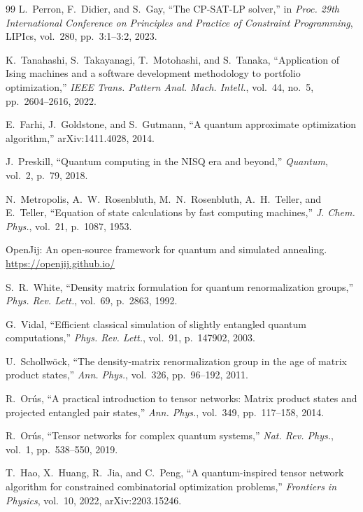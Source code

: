 \documentclass[twocolumn]{article}
\begin{document}
\begin{thebibliography}{99}
L.~Perron, F.~Didier, and S.~Gay,
``The CP-SAT-LP solver,''
in \emph{Proc. 29th International Conference on Principles and Practice
of Constraint Programming}, LIPIcs, vol.~280, pp.~3:1--3:2, 2023.

K.~Tanahashi, S.~Takayanagi, T.~Motohashi, and S.~Tanaka,
``Application of Ising machines and a software development methodology
to portfolio optimization,''
\emph{IEEE Trans. Pattern Anal. Mach. Intell.}, vol.~44, no.~5,
pp.~2604--2616, 2022.

E.~Farhi, J.~Goldstone, and S.~Gutmann,
``A quantum approximate optimization algorithm,''
arXiv:1411.4028, 2014.

J.~Preskill, ``Quantum computing in the NISQ era and beyond,''
\emph{Quantum}, vol.~2, p.~79, 2018.

N.~Metropolis, A.~W.~Rosenbluth, M.~N.~Rosenbluth, A.~H.~Teller,
and E.~Teller,
``Equation of state calculations by fast computing machines,''
\emph{J. Chem. Phys.}, vol.~21, p.~1087, 1953.

OpenJij: An open-source framework for quantum and simulated annealing.
\url{https://openjij.github.io/}

S.~R.~White, ``Density matrix formulation for quantum renormalization
groups,''
\emph{Phys. Rev. Lett.}, vol.~69, p.~2863, 1992.

G.~Vidal, ``Efficient classical simulation of slightly entangled
quantum computations,''
\emph{Phys. Rev. Lett.}, vol.~91, p.~147902, 2003.

U.~Schollw\"ock, ``The density-matrix renormalization group in the
age of matrix product states,''
\emph{Ann. Phys.}, vol.~326, pp.~96--192, 2011.

R.~Or\'us, ``A practical introduction to tensor networks: Matrix
product states and projected entangled pair states,''
\emph{Ann. Phys.}, vol.~349, pp.~117--158, 2014.

R.~Or\'us, ``Tensor networks for complex quantum systems,''
\emph{Nat. Rev. Phys.}, vol.~1, pp.~538--550, 2019.

T.~Hao, X.~Huang, R.~Jia, and C.~Peng,
``A quantum-inspired tensor network algorithm for constrained
combinatorial optimization problems,''
\emph{Frontiers in Physics}, vol.~10, 2022, arXiv:2203.15246.


\end{thebibliography}
\end{document}
